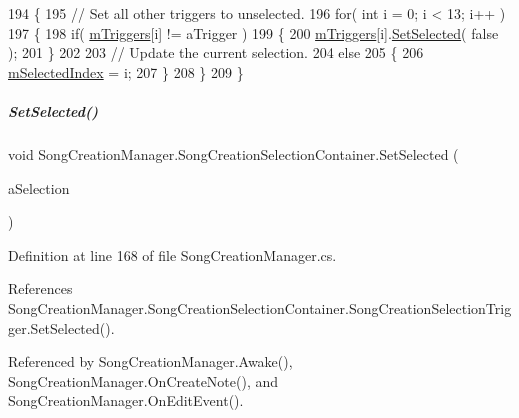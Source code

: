 \begin{DoxyCode}
194         \{
195             \textcolor{comment}{// Set all other triggers to unselected.}
196             \textcolor{keywordflow}{for}( \textcolor{keywordtype}{int} i = 0; i < 13; i++ )
197             \{
198                 \textcolor{keywordflow}{if}( \hyperlink{group___s_c_m_nest_class_aeda161975a8a683281b9388b2c905ae8}{mTriggers}[i] != aTrigger )
199                 \{
200                     \hyperlink{group___s_c_m_nest_class_aeda161975a8a683281b9388b2c905ae8}{mTriggers}[i].\hyperlink{group___s_c_m_nest_class_a0d65cd109a370034f580d63e823725b9}{SetSelected}( \textcolor{keyword}{false} );
201                 \}
202 
203                 \textcolor{comment}{// Update the current selection.}
204                 \textcolor{keywordflow}{else}
205                 \{
206                     \hyperlink{group___s_c_m_nest_class_a1684b25b3eb0e87f189996de22bf9792}{mSelectedIndex} = i;
207                 \}
208             \}
209         \}
\end{DoxyCode}
\mbox{\label{group___s_c_m_nest_class_ab3d74be007528e4e6686f89e8e993b3b}} 
\subparagraph{\texorpdfstring{Set\+Selected()}{SetSelected()}}
{\footnotesize\ttfamily void Song\+Creation\+Manager.\+Song\+Creation\+Selection\+Container.\+Set\+Selected (\begin{DoxyParamCaption}\item[{\hyperlink{group___music_enums_gaf11b5f079adbb21c800b9eca1c5c3cbd}{Music.\+N\+O\+T\+E\+\_\+\+L\+E\+N\+G\+TH}}]{a\+Selection }\end{DoxyParamCaption})}



Definition at line 168 of file Song\+Creation\+Manager.\+cs.



References Song\+Creation\+Manager.\+Song\+Creation\+Selection\+Container.\+Song\+Creation\+Selection\+Trigger.\+Set\+Selected().



Referenced by Song\+Creation\+Manager.\+Awake(), Song\+Creation\+Manager.\+On\+Create\+Note(), and Song\+Creation\+Manager.\+On\+Edit\+Event().


